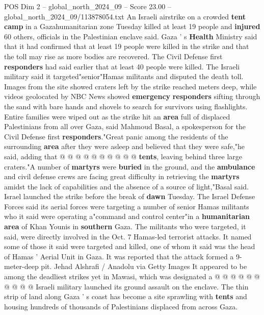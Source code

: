 \begin{textsample}{POS Dim 2 – global\_north\_2024\_09 – Score 23.00 – global\_north\_2024\_09/113878054.txt}  \label{ex:f2_pos_414}
An Israeli airstrike on a crowded \textbf{tent} \textbf{camp} in a Gazahumanitarian zone Tuesday killed at least 19 people and \textbf{injured} 60 others, officials in the Palestinian enclave said.
Gaza ' s \textbf{Health} Ministry said that it had confirmed that at least 19 people were killed in the strike and that the toll may rise as more bodies are recovered.
The Civil Defense first \textbf{responders} had said earlier that at least 40 people were killed.
The Israeli military said it targeted"senior"Hamas militants and disputed the death toll.
Images from the site showed craters left by the strike reached meters deep, while videos geolocated by NBC News showed \textbf{emergency} \textbf{responders} sifting through the sand with bare hands and shovels to search for survivors using flashlights.
Entire families were wiped out as the strike hit an \textbf{area} full of displaced Palestinians from all over Gaza, said Mahmoud Basal, a spokesperson for the Civil Defense first \textbf{responders}."Great panic among the residents of the surrounding \textbf{area} after they were asleep and believed that they were safe,"he said, adding that @ @ @ @ @ @ @ @ @ @ \textbf{tents}, leaving behind three large craters."A number of \textbf{martyrs} were \textbf{buried} in the ground, and the \textbf{ambulance} and civil defense crews are facing great difficulty in retrieving the \textbf{martyrs} amidst the lack of capabilities and the absence of a source of light,"Basal said.
Israel launched the strike before the break of \textbf{dawn} Tuesday.
The Israel Defense Forces said its aerial forces were targeting a number of senior Hamas militants who it said were operating a"command and control center"in a \textbf{humanitarian} \textbf{area} of Khan Younis in \textbf{southern} Gaza.
The militants who were targeted, it said, were directly involved in the Oct. 7 Hamas-led terrorist attacks.
It named some of those it said were targeted and killed, one of whom it said was the head of Hamas ' Aerial Unit in Gaza.
It was reported that the attack formed a 9-meter-deep pit.
Jehad Alshrafi / Anadolu via Getty Images It appeared to be among the deadliest strikes yet in Mawasi, which was designated a @ @ @ @ @ @ @ @ @ @ Israeli military launched its ground assault on the enclave.
The thin strip of land along Gaza ' s coast has become a site sprawling with \textbf{tents} and housing hundreds of thousands of Palestinians displaced from across Gaza.

\end{textsample}
